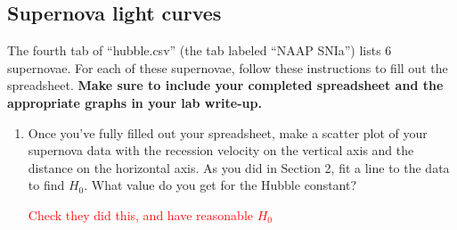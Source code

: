 \documentclass[11pt]{article}
\begin{document}
\subsection{Supernova light curves}

\medskip \noindent
The fourth tab of ``hubble.csv'' (the tab labeled ``NAAP SNIa'') lists 6 supernovae. For each of these supernovae, follow these instructions to fill out the spreadsheet.  \textbf{Make sure to include your completed spreadsheet and the appropriate graphs in your lab write-up.}

\begin{enumerate}
    \item [20 pts] Once you've fully filled out your spreadsheet, make a scatter plot of your supernova data with the recession velocity on the vertical axis and the distance on the horizontal axis. As you did in Section 2, fit a line to the data to find $H_0$. What value do you get for the Hubble constant?
    
    \textcolor{red}{Check they did this, and have reasonable $H_0$}
\end{enumerate}
\end{document}
